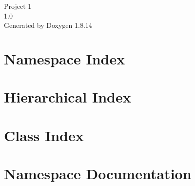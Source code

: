 \documentclass[twoside]{book}
\newcommand{\+}{\discretionary{\mbox{\scriptsize$\hookleftarrow$}}{}{}}
\newcommand{\clearemptydoublepage}{%
  \newpage{\pagestyle{empty}\cleardoublepage}%
}
\begin{document}
\hypersetup{pageanchor=false,
             bookmarksnumbered=true,
             pdfencoding=unicode
            }
\begin{titlepage}
\vspace*{7cm}
\begin{center}%
{\Large Project 1 \\[1ex]\large 1.\+0 }\\
\vspace*{1cm}
{\large Generated by Doxygen 1.8.14}\\
\end{center}
\end{titlepage}
\clearemptydoublepage
{}
\tableofcontents
\clearemptydoublepage
{}
\hypersetup{pageanchor=true}

\chapter{Namespace Index}

\chapter{Hierarchical Index}

\chapter{Class Index}

\chapter{Namespace Documentation}









\end{document}
